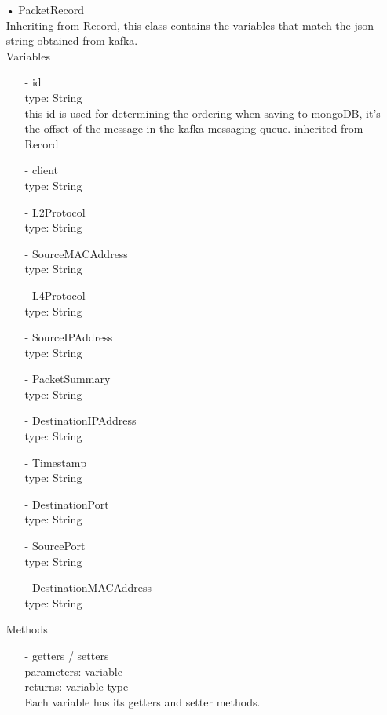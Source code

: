 \documentclass[oneside, english, final]{design}
\begin{document}
\begin{itemize}
	\item[•]PacketRecord
	      \\Inheriting from Record, this class contains the variables that match the json string obtained from kafka.
	      \\Variables
	      \begin{itemize}
		      \item[-] id
		            \\type: String
		            \\this id is used for determining the ordering when saving to mongoDB, it's the offset of the message in the kafka messaging queue. inherited from Record
		      \item[-] client
		            \\type: String
		      \item[-] L2Protocol
		            \\type: String
		      \item[-] SourceMACAddress
		            \\type: String
		      \item[-] L4Protocol
		            \\type: String
		      \item[-] SourceIPAddress
		            \\type: String
		      \item[-] PacketSummary
		            \\type: String
		      \item[-] DestinationIPAddress
		            \\type: String
		      \item[-] Timestamp
		            \\type: String
		      \item[-] DestinationPort
		            \\type: String
		      \item[-] SourcePort
		            \\type: String
		      \item[-] DestinationMACAddress
		            \\type: String

	      \end{itemize}

	      Methods
	      \begin{itemize}
		      \item[-]getters / setters
		            \\parameters: variable
		            \\returns: variable type
		            \\Each variable has its getters and setter methods.
	      \end{itemize}


\end{itemize}
\end{document}
